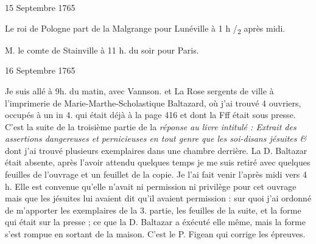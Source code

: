                      \begin{diary}{15 Septembre 1765}{}


                           Le roi de Pologne part de la
                              Malgrange
                           pour Lunéville à 1 h /\textsubscript{2} après midi. \bigskip



                           M. le comte de Stainville à 11 h.
                           du
                           soir pour Paris. \bigskip


                     \end{diary}

                     \begin{diary}{16 Septembre 1765}{}

                         Je suis allé à 9h. du matin, avec
                              Vannson.
                           et La Rose sergents de ville à
                           l'imprimerie de
                           Marie-Marthe-Scholastique
                              Baltazard, où
                           j'ai trouvé 4 ouvriers, occupés à un in 4\degre.
                           qui était déjà à la page 416 et dont la
                           Fff était sous
                           presse. C'est la suite de la
                           troisième partie de la \emph{réponse au livre
                              intitulé : \emph{Extrait des assertions dangereuses
                                 et pernicieuses en tout genre que les soi-disans
                                 jésuites \&}} dont j'ai trouvé plusieurs exemplaires
                           dans une chambre derrière. La
                                 D. Baltazar
                           était absente, après l'avoir attendu quelques
                           temps je me suis retiré avec quelques feuilles
                           de l'ouvrage et un feuillet de la copie. Je l'ai
                           fait venir l'après midi vers 4 h. Elle est convenue
                           qu'elle n'avait ni permission ni privilège pour
                           cet ouvrage mais que les jésuites lui avaient
                           dit qu'il avaient permission : sur quoi j'ai ordonné de m'apporter les exemplaires de la
                           3. partie, les feuilles de la suite, et la
                           forme qui était sur la presse ; ce que la
                                 D.
                              Baltazar a éxécuté elle même, mais la
                           forme s'est rompue en sortant de la maison.
                           C'est le P. Figean qui corrige
                           les épreuves. \bigskip


                     \end{diary}

